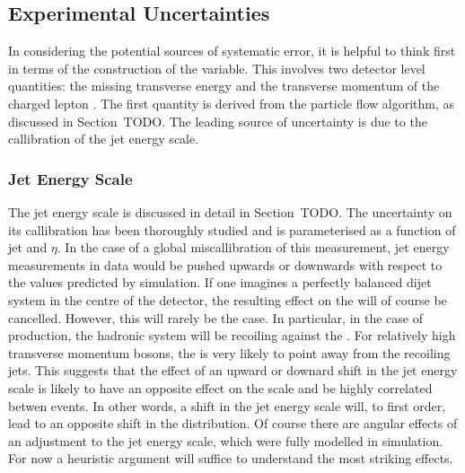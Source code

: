 \subsection{Experimental Uncertainties}
In considering the potential sources of systematic error, it is helpful to think
first in terms of the construction of the \LP variable. This involves two
detector level quantities: the missing transverse energy \MET and the transverse
momentum of the charged lepton \Ptl. The first quantity is derived from the
particle flow algorithm, as discussed in Section~TODO. The leading source of
uncertainty is due to the callibration of the jet energy scale.

\subsubsection{Jet Energy Scale}
\label{sec:wpol_syst_jec}
The jet energy scale is discussed in detail in Section~TODO. The uncertainty on
its callibration has been thoroughly studied and is parameterised as a function
of jet \Pt and $\eta$. In the case of a global miscallibration of this
measurement, jet energy measurements in data would be pushed upwards or
downwards with respect to the values predicted by simulation. If one imagines a
perfectly balanced dijet system in the centre of the detector, the resulting
effect on the \MET will of course be cancelled. However, this will rarely be the
case. In particular, in the case of \Wjets production, the hadronic system will
be recoiling against the \PW. For relatively high transverse momentum \PW
bosons, the \MET is very likely to point away from the recoiling jets. This
suggests that the effect of an upward or downard shift in the jet energy scale
is likely to have an opposite effect on the \MET scale and be highly correlated
betwen events. In other words, a shift in the jet energy scale will, to first
order, lead to an opposite shift in the \MET distribution. Of course there are
angular effects of an adjustment to the jet energy scale, which were fully
modelled in simulation. For now a heuristic argument will suffice to understand
the most striking effects.


